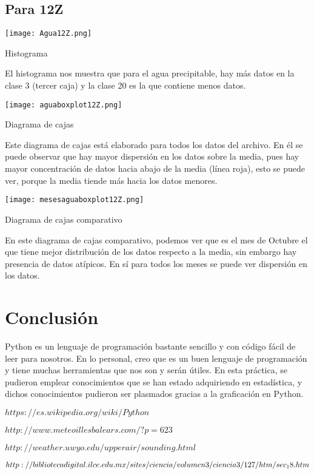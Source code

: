 \documentclass[12pt]{article}
\begin{document}
\begin{doublespace}
\subsection*{Para 12Z}
\begin{center}
\texttt{[image: Agua12Z.png]}

Histograma
\end{center}

El histograma nos muestra que para el agua precipitable, hay más datos en la clase 3 (tercer caja) y la clase 20 es la que contiene menos datos.

\begin{center}
\vspace{1 cm}

\texttt{[image: aguaboxplot12Z.png]}

Diagrama de cajas
\end{center}
Este diagrama de cajas está elaborado para todos los datos del archivo. En él se puede observar que hay mayor dispersión en los datos sobre la media, pues hay mayor concentración de datos hacia abajo de la media (línea roja), esto se puede ver, porque la media tiende más hacia los datos menores.
\begin{center}
\vspace{1 cm}

\texttt{[image: mesesaguaboxplot12Z.png]}

Diagrama de cajas comparativo
\end{center}
En este diagrama de cajas comparativo, podemos ver que es el mes de Octubre el que tiene mejor distribución de los datos respecto a la media, sin embargo hay presencia de datos atípicos. En sí para todos los meses se puede ver dispersión en los datos.
\section{Conclusión}
Python es un lenguaje de programación bastante sencillo y con código fácil de leer para nosotros. En lo personal, creo que es un buen lenguaje de programación y tiene muchas herramientas que nos son y serán útiles. En esta práctica, se pudieron emplear conocimientos que se han estado adquiriendo en estadística, y dichos conocimientos pudieron ser plasmados gracias a la graficación en Python.

\newpage
\renewcommand{\refname}{\section{Referencias}}
\begin{thebibliography}{9}
 \textsc{$https://es.wikipedia.org/wiki/Python$}

 \textsc{$http://www.meteoillesbalears.com/?p=623$}

 \textsc{$http://weather.uwyo.edu/upperair/sounding.html$}

 \textsc{$http://bibliotecadigital.ilce.edu.mx/sites/ciencia/volumen3/ciencia3/
\\
127/htm/sec_18.htm$}
\end{thebibliography}

\end{doublespace}
\end{document}
